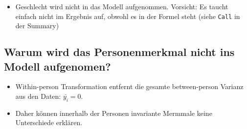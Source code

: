 \documentclass[]{book}
\newenvironment{Shaded}{\begin{snugshade}}{\end{snugshade}}
\newcommand{\DataTypeTok}[1]{\textcolor[rgb]{0.13,0.29,0.53}{#1}}
\newcommand{\DecValTok}[1]{\textcolor[rgb]{0.00,0.00,0.81}{#1}}
\newcommand{\FloatTok}[1]{\textcolor[rgb]{0.00,0.00,0.81}{#1}}
\newcommand{\KeywordTok}[1]{\textcolor[rgb]{0.13,0.29,0.53}{\textbf{#1}}}
\newcommand{\NormalTok}[1]{#1}
\newcommand{\OperatorTok}[1]{\textcolor[rgb]{0.81,0.36,0.00}{\textbf{#1}}}
\newcommand{\OtherTok}[1]{\textcolor[rgb]{0.56,0.35,0.01}{#1}}
\newcommand{\StringTok}[1]{\textcolor[rgb]{0.31,0.60,0.02}{#1}}
\providecommand{\tightlist}{%
  \setlength{\itemsep}{0pt}\setlength{\parskip}{0pt}}
\begin{document}
\begin{itemize}
\tightlist
\item
  Geschlecht wird nicht in das Modell aufgenommen. Vorsicht: Es taucht einfach nicht im Ergebnis auf, obwohl es in der Formel steht (siehe \texttt{Call} in der Summary)
\end{itemize}

\hypertarget{warum-wird-das-personenmerkmal-nicht-ins-modell-aufgenomen}{%
\subsection*{Warum wird das Personenmerkmal nicht ins Modell aufgenomen?}\label{warum-wird-das-personenmerkmal-nicht-ins-modell-aufgenomen}}

\begin{itemize}
\tightlist
\item
  Within-person Transformation entfernt die gesamte between-person Varianz aus den Daten: \(\bar{y_{i}} = 0\).
\item
  Daher können innerhalb der Personen invariante Mermmale keine Unterschiede erklären.
\end{itemize}

\begin{Shaded}
\end{Shaded}
\end{document}
